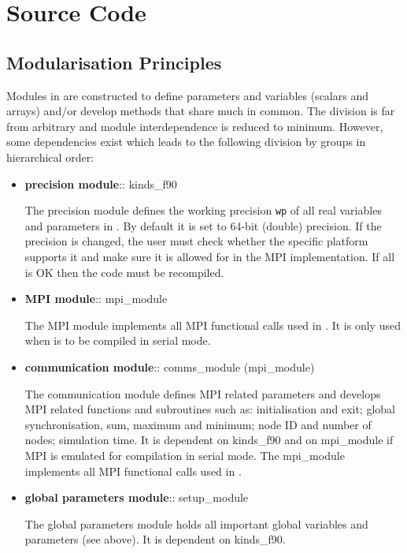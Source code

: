 \section{Source Code}
\label{source-code}

\subsection{Modularisation Principles}
\label{modularisation}

Modules in \D are constructed to define parameters and variables
(scalars and arrays) and/or develop methods that share much in
common.  The division is far from arbitrary and module
interdependence is reduced to minimum.  However, some dependencies
exist which leads to the following division by groups in
hierarchical order:
\begin{itemize}

\item {\bf precision module}:: {\sc kinds\_f90}

The precision module defines the working precision {\tt wp} of all
real variables and parameters in \D.  By default it is set to 64-bit
(double) precision.  If the precision is changed, the user must
check whether the specific platform supports it and make sure it is
allowed for in the MPI implementation.  If all is OK then the code
must be recompiled.

\item {\bf MPI module}:: {\sc mpi\_module}

The MPI module implements all MPI functional calls used in \D.  It
is only used when \D is to be compiled in serial mode.

\item {\bf communication module}:: {\sc comms\_module}
({\sc mpi\_module})

The communication module defines MPI related parameters and develops
MPI related functions and subroutines such as: initialisation and
exit; global synchronisation, sum, maximum and minimum;
node ID and number of nodes; simulation time.  It is dependent on
{\sc kinds\_f90} and on {\sc mpi\_module} if MPI is emulated for
\D compilation in serial mode.  The {\sc mpi\_module} implements
all MPI functional calls used in \D.

\item {\bf global parameters module}:: {\sc setup\_module}

The global parameters module holds all important global variables
and parameters (see above).  It is dependent on {\sc kinds\_f90}.


\end{itemize}
